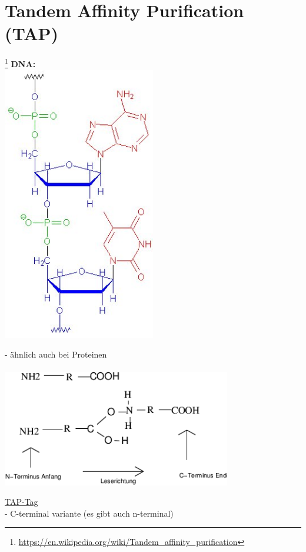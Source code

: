 \section{Tandem Affinity Purification (TAP)}\footnote{\url{https://en.wikipedia.org/wiki/Tandem_affinity_purification}}
\textbf{DNA:}\\
\includegraphics[width=0.5\textwidth]{lectures/160513/pix/dna_2_farb.jpg}

 - ähnlich auch bei Proteinen\\\\

\includegraphics[width=0.75\textwidth]{lectures/160513/pix/namenlos.png}

\underline{TAP-Tag}\\
 - C-terminal variante (es gibt auch n-terminal)

